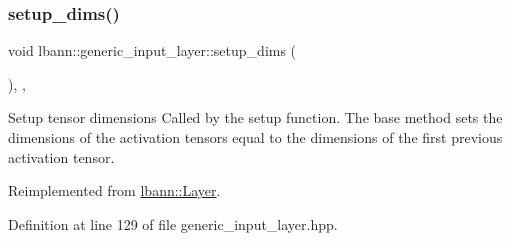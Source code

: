 \subsubsection{\texorpdfstring{setup\+\_\+dims()}{setup\_dims()}}
{\footnotesize\ttfamily void lbann\+::generic\+\_\+input\+\_\+layer\+::setup\+\_\+dims (\begin{DoxyParamCaption}{ }\end{DoxyParamCaption})\hspace{0.3cm}{\ttfamily [inline]}, {\ttfamily [override]}, {\ttfamily [virtual]}}

Setup tensor dimensions Called by the setup function. The base method sets the dimensions of the activation tensors equal to the dimensions of the first previous activation tensor. 

Reimplemented from \hyperlink{classlbann_1_1Layer_a90fce1b06c1f2abb480e18cfe08a9746}{lbann\+::\+Layer}.



Definition at line 129 of file generic\+\_\+input\+\_\+layer.\+hpp.


